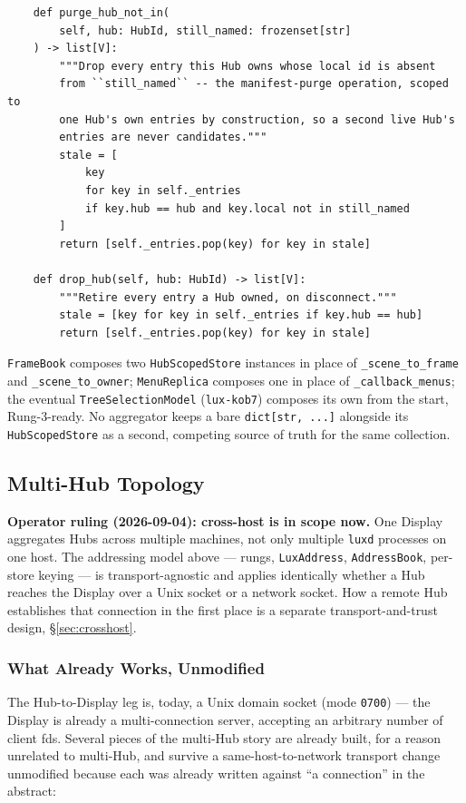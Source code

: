 \documentclass[a4paper,10pt]{article}
\newcommand{\tool}[1]{\texttt{#1}}
\newcommand{\field}[1]{\texttt{#1}}
\begin{document}
\begin{lstlisting}
    def purge_hub_not_in(
        self, hub: HubId, still_named: frozenset[str]
    ) -> list[V]:
        """Drop every entry this Hub owns whose local id is absent
        from ``still_named`` -- the manifest-purge operation, scoped to
        one Hub's own entries by construction, so a second live Hub's
        entries are never candidates."""
        stale = [
            key
            for key in self._entries
            if key.hub == hub and key.local not in still_named
        ]
        return [self._entries.pop(key) for key in stale]

    def drop_hub(self, hub: HubId) -> list[V]:
        """Retire every entry a Hub owned, on disconnect."""
        stale = [key for key in self._entries if key.hub == hub]
        return [self._entries.pop(key) for key in stale]
\end{lstlisting}

\texttt{FrameBook} composes two \texttt{HubScopedStore} instances in
place of \field{\_scene\_to\_frame} and \field{\_scene\_to\_owner};
\texttt{MenuReplica} composes one in place of \field{\_callback\_menus};
the eventual \texttt{TreeSelectionModel} (\texttt{lux-kob7}) composes its
own from the start, Rung-3-ready.  No aggregator keeps a bare
\texttt{dict[str, ...]} alongside its \texttt{HubScopedStore} as a
second, competing source of truth for the same collection.

\subsection{Multi-Hub Topology}

\textbf{Operator ruling (2026-09-04): cross-host is in scope now.}  One
Display aggregates Hubs across multiple machines, not only multiple
\tool{luxd} processes on one host.  The addressing model above --- rungs,
\texttt{LuxAddress}, \texttt{AddressBook}, per-store keying --- is
transport-agnostic and applies identically whether a Hub reaches the
Display over a Unix socket or a network socket.  How a remote Hub
establishes that connection in the first place is a separate
transport-and-trust design, \S\ref{sec:crosshost}.

\subsubsection{What Already Works, Unmodified}

The Hub-to-Display leg is, today, a Unix domain socket (mode
\texttt{0700}) --- the Display is already a multi-connection server,
accepting an arbitrary number of client fds.  Several pieces of the
multi-Hub story are already built, for a reason unrelated to multi-Hub, and
survive a same-host-to-network transport change unmodified because each
was already written against ``a connection'' in the abstract:
\end{document}
